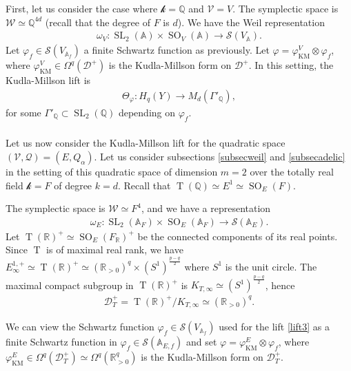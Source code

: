 \documentclass[11pt]{article} %
\newcommand{\8}{\infty}
\newcommand{\kbf}{\mathcal{k}}
\newcommand{\Tbf}{\operatorname{T}}
\newcommand{\SO}{\operatorname{SO}}
\newcommand{\SL}{\operatorname{SL}}
\newcommand{\KM}{\operatorname{KM}}
\newcommand{\D}{\mathcal{D}}
\newcommand{\R}{\mathbb{R}}
\newcommand{\A}{\mathbb{A}}
\newcommand{\Q}{\mathbb{Q}}
\newcommand{\Scal}{\mathcal{S}}
\newcommand{\Vcal}{\mathcal{V}}
\newcommand{\Wcal}{\mathcal{W}}
\newcommand{\Qcal}{\mathcal{Q}}
\newcommand{\fin}{f}
\theoremstyle{mytheoremstyle}
\theoremstyle{remark}
\numberwithin{equation}{section}
\begin{document}
\subsubsection{} First, let us consider the case where $\kbf=\Q$ and $\Vcal=V$. The symplectic space is $\Wcal \simeq \Q^{4d}$ (recall that the degree of $F$ is $d$). We have the Weil representation
\begin{align}
 \omega_V \colon \SL_2(\A) \times \SO_V({\A}) \longrightarrow \Scal(V_\A).   
\end{align}
Let $\varphi_\fin \in \Scal(V_{\A_\fin})$ a finite Schwartz function as previously. Let $\varphi=\varphi_{\KM}^V \otimes \varphi_\fin$, where $\varphi_{\KM}^V \in \Omega^{q}(\D^+)$ is the Kudla-Millson form on $\D^+$. In this setting, the Kudla-Millson lift is
\begin{align} \label{lift3}
    \Theta_{\varphi} \colon H_q(Y) \longrightarrow M_{d}(\Gamma'_\Q),
\end{align}
for some $\Gamma'_\Q \subset \SL_2(\Q)$ depending on $\varphi_\fin$.
\subsubsection{}   
Let us now consider the Kudla-Millson lift for the quadratic space $(\Vcal,\Qcal)=(E,Q_\alpha)$. Let us consider subsections \ref{subsecweil} and \ref{subsecadelic} in the setting of this quadratic space of dimension $m=2$ over the totally real field $\kbf=F$ of degree $k=d$. Recall that $\Tbf(\Q) \simeq E^1 \simeq \SO_E(F)$. 

The symplectic space is $\Wcal \simeq F^4$, and we have a representation
\begin{align}
 \omega_E \colon \SL_2(\A_F) \times \SO_E(\A_F) \longrightarrow \Scal(\A_E).   
\end{align}
Let $\Tbf(\R)^+ \simeq \SO_E(F_\R)^+$ be the connected components of its real points. Since $\Tbf$ is of maximal real rank, we have $E_\8^{1,+} \simeq \Tbf(\R)^+\simeq (\R_{>0})^q \times (S^1)^\frac{p-q}{2}$ where $S^1$ is the unit circle. The maximal compact subgroup in $\Tbf(\R)^+$ is $K_{T,\8} \simeq (S^1)^\frac{p-q}{2}$, hence
\begin{align}
    \D_T^+=\Tbf(\R)^+ / K_{T,\8} \simeq (\R_{>0})^q.
\end{align}


We can view the Schwartz function $\varphi_\fin \in \Scal(V_{\A_\fin})$ used for the lift \eqref{lift3} as a finite Schwartz function in $\varphi_\fin \in \Scal(\A_{E,\fin})$ and set $\varphi=\varphi_{\KM}^E \otimes \varphi_\fin$, where $\varphi_{\KM}^E \in \Omega^{q}(\D_T^+) \simeq \Omega^{q}(\R_{>0}^{q})$ is the Kudla-Millson form on $\D_T^+$. 
\end{document}
